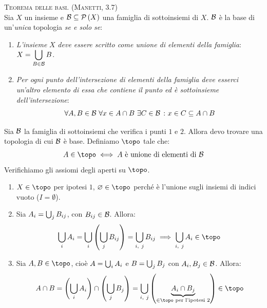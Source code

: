 \begin{theorema}\textsc{Teorema delle basi. (Manetti, 3.7)}\label{teoremabasi}\\
Sia $X$ un insieme e $\mathcal{B}\subseteq\mathcal{P}\left(X\right)$ una famiglia di sottoinsiemi di $X$. $\mathcal{B}$ è la base di un'\textit{unica} topologia \textit{se e solo se}:
\begin{enumerate}
\item \textit{L'insieme} $X$ \textit{deve essere scritto come unione di elementi della famiglia}: $\displaystyle X=\mathop{{\bigcup}}\displaylimits_{B\in \mathcal{B}}B$.
\item \textit{Per ogni punto dell'intersezione di elementi della famiglia deve esserci un'altro elemento di essa che contiene il punto ed è sottoinsieme dell'intersezione}:
\begin{equation}
	\forall A, B\in\basis\ \forall x\in A\cap B\ \exists C\in \basis\ \colon x\in C\subseteq A\cap B
\end{equation}
\end{enumerate}
\vspace{-6mm}
\end{theorema}
\begin{demonstration}
Sia $\mathcal{B}$ la famiglia di sottoinsiemi che verifica i punti $1$ e $2$. Allora devo trovare una topologia di cui $\mathcal{B}$ è base. Definiamo $\topo$ tale che:
\begin{equation*}
A\in\topo\iff A\text{ è unione di elementi di }\basis
\end{equation*}
Verifichiamo gli assiomi degli aperti su $\topo$.
\begin{enumerate}[label=\Roman*]
\item $X\in\topo$ per ipotesi $1$, $\emptyset\in\topo$ perché è l'unione sugli insiemi di indici vuoto ($I=\emptyset$).
\item Sia $A_i=\mathop{{\bigcup}}\displaylimits_{j}B_{ij}$, con $B_{ij}\in\mathcal{B}$. Allora:
\begin{equation*}
\union_{i}A_i=\union_{i}\left(\union_{j}B_{ij}\right)=\union_{i,\ j}B_{ij}\implies\union_{i,\ j}A_i\in\topo
\end{equation*}
\item Sia $A, B\in\topo$, cioè $A=\mathop{{\bigcup}}\displaylimits_{i}A_i$ e $B=\mathop{{\bigcup}}\displaylimits_{j}B_j$ con $A_i, B_j\in\mathcal{B}$. Allora:
\begin{equation*}
A\cap B=\left(\union_{i}A_i\right)\cap\left(\union_{j}B_j\right)=\union_{i,\ j}\left(\underbrace{A_i\cap B_j}_{\in\topo\text{ per l'ipotesi }2}\right)\in\topo 
\end{equation*}
\end{enumerate}
\vspace{-6mm}
\end{demonstration}
